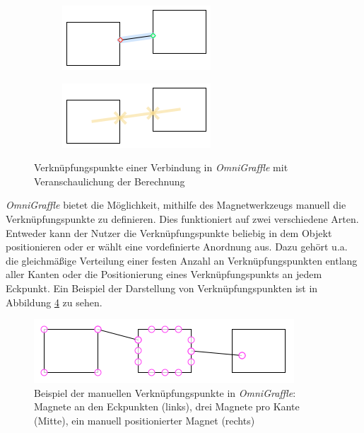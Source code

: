\begin{figure}[hbt]
    \newcommand{\subfigurewidth}{0.5\textwidth}
    \newcommand{\graphicswidth}{0.8\linewidth}
    \begin{subfigure}{\subfigurewidth}
        \centering
        \includegraphics[width=\graphicswidth]{assets/omnigraffle-connection-points-a}
        \caption{}
        \label{fig:omnigraffle-connection-points-a}
    \end{subfigure}
    \begin{subfigure}{\subfigurewidth}
        \centering
        \includegraphics[width=\graphicswidth]{assets/omnigraffle-connection-points-b}
        \caption{}
        \label{fig:omnigraffle-connection-points-b}
    \end{subfigure}
    \caption{Verknüpfungspunkte einer Verbindung in \textit{OmniGraffle}  mit Veranschaulichung der Berechnung }
    \label{fig:omnigraffle-connection-points}
\end{figure}

\textit{OmniGraffle} bietet die Möglichkeit, mithilfe des Magnetwerkzeugs manuell die Verknüpfungspunkte zu definieren. Dies funktioniert auf zwei verschiedene Arten. Entweder kann der Nutzer die Verknüpfungspunkte beliebig in dem Objekt positionieren oder er wählt eine vordefinierte Anordnung aus. Dazu gehört u.a. die gleichmäßige Verteilung einer festen Anzahl an Verknüpfungspunkten entlang aller Kanten oder die Positionierung eines Verknüpfungspunkts an jedem Eckpunkt. Ein Beispiel der Darstellung von Verknüpfungspunkten ist in Abbildung \ref{fig:omnigraffle-magnets-example} zu sehen.

\begin{figure}[hbt]
    \centering
    \includegraphics{assets/omnigraffle-magnets-example.png}
    \caption{Beispiel der manuellen Verknüpfungspunkte in \textit{OmniGraffle}: Magnete an den Eckpunkten (links), drei Magnete pro Kante (Mitte), ein manuell positionierter Magnet (rechts)}
    \label{fig:omnigraffle-magnets-example}
\end{figure}

